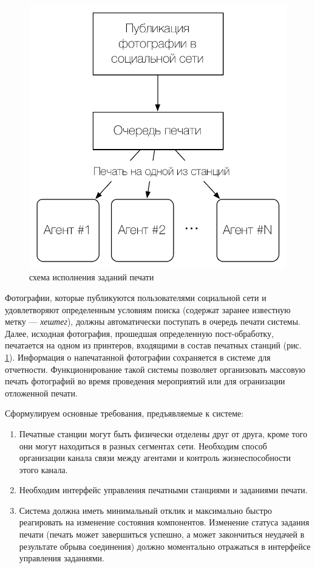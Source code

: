 \documentclass[a4paper,14pt,href]{article}
\begin{document}
\begin{figure}[htbp]
\begin{center}
  \includegraphics[scale=0.7]{print-schema.pdf}
    \caption{схема исполнения заданий печати}
    \label{fig:PrintSchema}
\end{center}
\end{figure}

Фотографии, которые публикуются пользователями социальной сети и удовлетворяют определенным условиям поиска
(содержат заранее известную метку --- \textit{хештег}), должны автоматически поступать в очередь печати системы.
Далее, исходная фотография, прошедшая определенную пост-обработку, печатается на одном из принтеров, входящими в
состав печатных станций (рис. \ref{fig:PrintSchema}). Информация о напечатанной фотографии сохраняется в системе для
отчетности. Функционирование такой системы позволяет организовать массовую печать фотографий во время проведения
мероприятий или для огранизации отложенной печати.

Сформулируем основные требования, предъявляемые к системе:
\begin{enumerate}
  \item Печатные станции могут быть физически отделены друг от друга, кроме того они могут находиться в разных
  сегментах сети. Необходим способ организации канала связи между агентами и контроль жизнеспособности этого канала.

  \item Необходим интерфейс управления печатными станциями и заданиями печати.

  \item Система должна иметь минимальный отклик и максимально быстро реагировать на изменение состояния компонентов.
  Изменение статуса задания печати (печать может завершиться успешно, а может закончиться неудачей в результате
  обрыва соединения) должно моментально отражаться в интерфейсе управления заданиями.
\end{enumerate}
\end{document}
